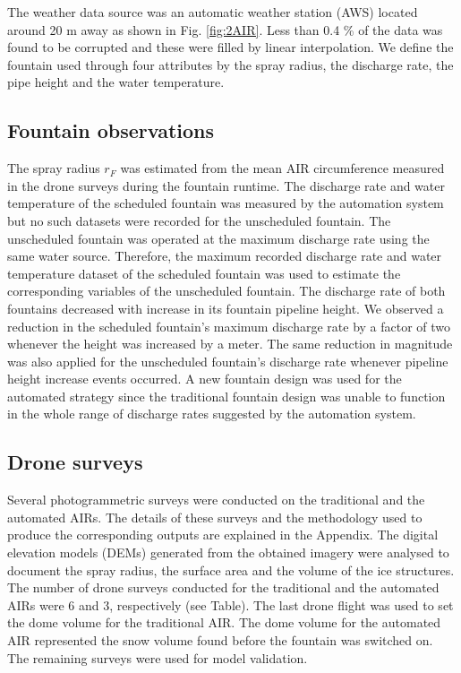 \documentclass[tc, manuscript]{copernicus}
\begin{document}
The weather data source was an automatic weather station (AWS) located around 20 m away as shown in Fig.
\ref{fig:2AIR}. Less than 0.4 \% of the data was found to be corrupted and these were filled by linear
interpolation. We define the fountain used through four attributes by the spray radius, the discharge rate, the
pipe height and the water temperature.

\subsection{Fountain observations}

The spray radius $r_F$ was estimated from the mean AIR circumference measured in the drone surveys during the
fountain runtime. The discharge rate and water temperature of the scheduled fountain was measured by the
automation system but no such datasets were recorded for the unscheduled fountain. The unscheduled fountain was
operated at the maximum discharge rate using the same water source. Therefore, the maximum recorded discharge
rate and water temperature dataset of the scheduled fountain was used to estimate the corresponding variables of
the unscheduled fountain. The discharge rate of both fountains decreased with increase in its fountain pipeline
height. We observed a reduction in the scheduled fountain's maximum discharge rate by a factor of two whenever
the height was increased by a meter. The same reduction in magnitude was also applied for the unscheduled
fountain's discharge rate whenever pipeline height increase events occurred. A new fountain design was used for
the automated strategy since the traditional fountain design was unable to function in the whole range of
discharge rates suggested by the automation system.

\subsection{Drone surveys}

Several photogrammetric surveys were conducted on the traditional and the automated AIRs. The details of these
surveys and the methodology used to produce the corresponding outputs are explained in the Appendix. The digital
elevation models (DEMs) generated from the obtained imagery were analysed to document the spray radius, the
surface area and the volume of the ice structures. The number of drone surveys conducted for the traditional and
the automated AIRs were 6 and 3, respectively (see Table). The last drone flight was used to set the dome volume
for the traditional AIR. The dome volume for the automated AIR represented the snow volume found before the
fountain was switched on. The remaining surveys were used for model validation.
\end{document}
